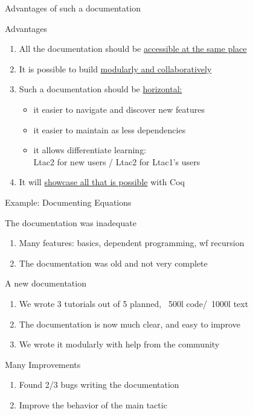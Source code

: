 \documentclass[10pt]{beamer}
\begin{document}
\begin{frame}{Advantages of such a documentation}
  \begin{tcbProp}{Advantages}
    \begin{enumerate}
      \item<1-> All the documentation should be \ul{accessible at the same place}
      \item<2-> It is possible to build \ul{modularly and collaboratively}
      \item<3-> Such a documentation should be \ul{horizontal:}
      \begin{itemize}[label=$-$]
        \item it easier to navigate and discover new features
        \item it easier to maintain as less dependencies
        \item it allows differentiate learning: \\
              Ltac2 for new users\;  /  \;Ltac2 for Ltac1's users
      \end{itemize}
      \item<4-> It will \ul{showcase all that is possible} with Coq
    \end{enumerate}
  \end{tcbProp}
\end{frame}

\begin{frame}{Example: Documenting Equations}
  \begin{tcbPbl}{The documentation was inadequate}
    \begin{enumerate}
      \item Many features: basics, dependent programming, wf recursion
      \item The documentation was old and not very complete
    \end{enumerate}
  \end{tcbPbl}
  \begin{tcbProp}{A new documentation}
    \begin{enumerate}
      \item We wrote 3 tutorials out of 5 planned, ~500l code/~1000l text
      \item The documentation is now much clear, and easy to improve
      \item We wrote it modularly with help from the community
    \end{enumerate}
    \end{tcbProp}
  \begin{tcbSol}{Many Improvements}
  \begin{enumerate}
    \item Found 2/3 bugs writing the documentation
    \item Improve the behavior of the main tactic
  \end{enumerate}
  \end{tcbSol}
\end{frame}
\end{document}

